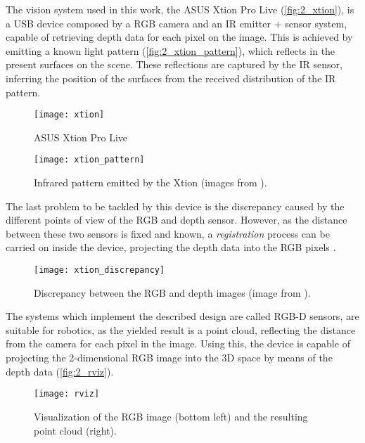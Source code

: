 The vision system used in this work, the ASUS Xtion Pro Live (\autoref{fig:2_xtion}), is a USB device composed by a RGB camera and an IR emitter + sensor system, capable of retrieving depth data for each pixel on the image. This is achieved by emitting a known light pattern (\autoref{fig:2_xtion_pattern}), which reflects in the present surfaces on the scene. These reflections are captured by the IR sensor, inferring the position of the surfaces from the received distribution of the IR pattern.

\begin{figure}[h]
	\centering
	\texttt{[image: xtion]}
	\caption{ASUS Xtion Pro Live}
	\label{fig:2_xtion}
\end{figure}

\begin{figure}[h]
	\centering
	\texttt{[image: xtion\_pattern]}
	\caption{Infrared pattern emitted by the Xtion (images from \cite{rgbd_poses}).}
	\label{fig:2_xtion_pattern}
\end{figure}

The last problem to be tackled by this device is the discrepancy caused by the different points of view of the RGB and depth sensor. However, as the distance between these two sensors is fixed and known, a \textit{registration} process can be carried on inside the device, projecting the depth data into the RGB pixels \cite{diapos_cv_registration}.\\

\begin{figure}[h]
	\centering
	\texttt{[image: xtion\_discrepancy]}
	\caption{Discrepancy between the RGB and depth images (image from \cite{tfg}).}
	\label{fig:2_xtion_discrepancy}
\end{figure}

The systems which implement the described design are called RGB-D sensors, are suitable for robotics, as the yielded result is a point cloud, reflecting the distance from the camera for each pixel in the image. Using this, the device is capable of projecting the 2-dimensional RGB image into the 3D space by means of the depth data (\autoref{fig:2_rviz}).\\

\begin{figure}[h]
	\centering
	\texttt{[image: rviz]}
	\caption{Visualization of the RGB image (bottom left) and the resulting point cloud (right).}
	\label{fig:2_rviz}
	
\end{figure}

